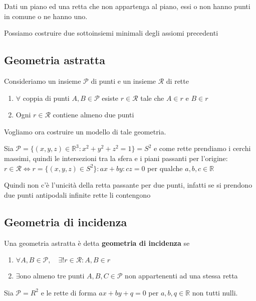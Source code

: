 Dati un piano ed una retta che non appartenga al piano, essi o non hanno punti
in comune o ne hanno uno.

Possiamo costruire due sottoinsiemi minimali degli assiomi precedenti 
\subsection{Geometria astratta}
Consideriamo un insieme \(\mathcal{P}\) di punti e un insieme \(\mathcal{R}\) di rette
\begin{enumerate}[label = \arabic*.]
    \item \(\forall \) coppia di punti \(A, B \in \mathcal{P}\) esiste \(r \in
        \mathcal{R}\) tale che \(A \in r\) e \(B \in r\) 
    \item Ogni \(r \in \mathcal{R}\) contiene almeno due punti
\end{enumerate}
Vogliamo ora costruire un modello di tale geometria.
\begin{example}
    Sia \(\mathcal{P} = \{{(x,y,z)} \in \mathbb{R}^3 : x^2 + y^2 +z^2 = 1\} =
    S^2 \) e come rette prendiamo i cerchi massimi, quindi le intersezioni tra
    la sfera e i piani passanti per l'origine: \(r \in \mathcal{R} \iff r =
    \{{(x, y, z)} \in S^2 \} : ax + by : cz = 0 \) per qualche \(a, b, c \in \mathbb{R}\) 

    Quindi non c'è l'unicità della retta passante per due punti, infatti se si
    prendono due punti antipodali infinite rette li contengono
\end{example}
\subsection{Geometria di incidenza}
Una geometria astratta è detta \textbf{geometria di incidenza} se 
\begin{enumerate}[label = \arabic*.]
    \item \(\forall A, B \in \mathcal{P}, \quad \exists ! r \in \mathcal{R}: A,
        B \in r \) 
    \item \(\exists\)ono almeno tre punti \(A, B , C \in \mathcal{P}\) non
        appartenenti ad una stessa retta
\end{enumerate}

\begin{example}
    Sia \(\mathcal{P}= R^2\) e le rette di forma \(ax + by + q = 0\) per \(a, b,
    q \in \mathbb{R}\) non tutti nulli.
\end{example}

